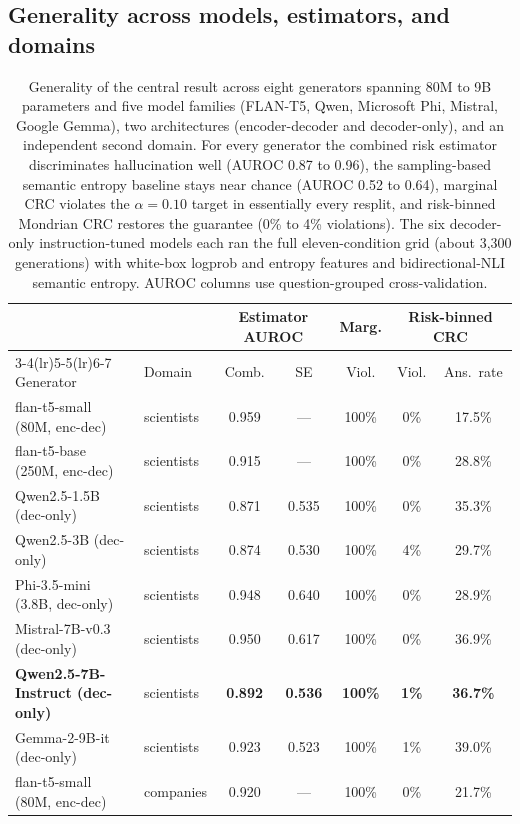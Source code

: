 \documentclass[sn-basic]{sn-jnl}
\theoremstyle{thmstyleone}
\theoremstyle{thmstyletwo}
\begin{document}
\subsection{Generality across models, estimators, and domains}
\label{sec:generality}

\begin{table}[tbp]
\centering\footnotesize\setlength{\tabcolsep}{4pt}
\caption{Generality of the central result across eight generators
spanning 80M to 9B parameters and five model families (FLAN-T5, Qwen,
Microsoft Phi, Mistral, Google Gemma), two architectures
(encoder-decoder and decoder-only), and an independent second domain.
For every generator the combined risk estimator discriminates
hallucination well (AUROC 0.87 to 0.96), the sampling-based semantic
entropy baseline stays near chance (AUROC 0.52 to 0.64), marginal CRC
violates the $\alpha = 0.10$ target in essentially every resplit, and
risk-binned Mondrian CRC restores the guarantee (0\% to 4\%
violations). The six decoder-only instruction-tuned models each ran the
full eleven-condition grid (about 3{,}300 generations) with white-box
logprob and entropy features and bidirectional-NLI semantic entropy.
AUROC columns use question-grouped cross-validation.}
\label{tab:generality}
\begin{tabular}{llccccc}
\toprule
& & \multicolumn{2}{c}{Estimator AUROC} &
\multicolumn{1}{c}{Marg.} & \multicolumn{2}{c}{Risk-binned CRC} \\
\cmidrule(lr){3-4}\cmidrule(lr){5-5}\cmidrule(lr){6-7}
Generator & Domain & Comb. & SE & Viol. & Viol. & Ans.\ rate \\
\midrule
flan-t5-small (80M, enc-dec)    & scientists & 0.959 & ---   & 100\% & 0\% & 17.5\% \\
flan-t5-base (250M, enc-dec)    & scientists & 0.915 & ---   & 100\% & 0\% & 28.8\% \\
Qwen2.5-1.5B (dec-only)         & scientists & 0.871 & 0.535 & 100\% & 0\% & 35.3\% \\
Qwen2.5-3B (dec-only)           & scientists & 0.874 & 0.530 & 100\% & 4\% & 29.7\% \\
Phi-3.5-mini (3.8B, dec-only)   & scientists & 0.948 & 0.640 & 100\% & 0\% & 28.9\% \\
Mistral-7B-v0.3 (dec-only)      & scientists & 0.950 & 0.617 & 100\% & 0\% & 36.9\% \\
\textbf{Qwen2.5-7B-Instruct (dec-only)} & scientists & \textbf{0.892} & \textbf{0.536} & \textbf{100\%} & \textbf{1\%} & \textbf{36.7\%} \\
Gemma-2-9B-it (dec-only)        & scientists & 0.923 & 0.523 & 100\% & 1\% & 39.0\% \\
flan-t5-small (80M, enc-dec)    & companies  & 0.920 & ---   & 100\% & 0\% & 21.7\% \\
\bottomrule
\end{tabular}
\end{table}
\end{document}

